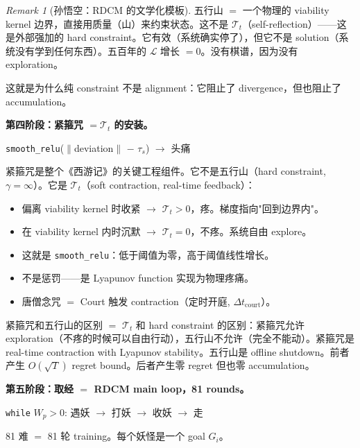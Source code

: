 \documentclass[11pt,a4paper]{article}
\theoremstyle{definition}
\theoremstyle{remark}
\newtheorem{remark}[theorem]{Remark}
\begin{document}
\begin{remark}[孙悟空：RDCM 的文学化模板]
五行山 $=$ 一个物理的 viability kernel 边界，直接用质量（山）来约束状态。这不是 $\mathcal{T}_t$（self-reflection）——这是外部强加的 hard constraint。它有效（系统确实停了），但它不是 solution（系统没有学到任何东西）。五百年的 $\mathcal{L}$ 增长 $= 0$。没有棋谱，因为没有 exploration。

这就是为什么纯 constraint 不是 alignment：它阻止了 divergence，但也阻止了 accumulation。

\medskip

{\color{orange!70!black} \textbf{第四阶段：紧箍咒 $= \mathcal{T}_t$ 的安装。}}

\begin{center}
{\color{orange!70!black} \texttt{smooth\_relu}($\|$deviation$\|$ $-$ $\tau_s$) $\to$ 头痛}
\end{center}

紧箍咒是整个《西游记》的关键工程组件。它不是五行山（hard constraint, $\gamma = \infty$）。它是 $\mathcal{T}_t$（soft contraction, real-time feedback）：

\begin{itemize}[nosep]
  \item 偏离 viability kernel 时收紧 $\to$ $\mathcal{T}_t > 0$，疼。梯度指向"回到边界内"。
  \item 在 viability kernel 内时沉默 $\to$ $\mathcal{T}_t = 0$，不疼。系统自由 explore。
  \item 这就是 \texttt{smooth\_relu}：低于阈值为零，高于阈值线性增长。
  \item 不是惩罚——是 Lyapunov function 实现为物理疼痛。
  \item 唐僧念咒 $=$ Court 触发 contraction（定时开庭, $\Delta t_{\mathrm{court}}$）。
\end{itemize}

紧箍咒和五行山的区别 $=$ $\mathcal{T}_t$ 和 hard constraint 的区别：紧箍咒允许 exploration（不疼的时候可以自由行动），五行山不允许（完全不能动）。紧箍咒是 real-time contraction with Lyapunov stability。五行山是 offline shutdown。前者产生 $O(\sqrt{T})$ regret bound。后者产生零 regret 但也零 accumulation。

\medskip

{\color{blue!70!black} \textbf{第五阶段：取经 $=$ RDCM main loop，81 rounds。}}

\begin{center}
{\color{blue!70!black} \texttt{while} $W_p > 0$: 遇妖 $\to$ 打妖 $\to$ 收妖 $\to$ 走}
\end{center}

81 难 $=$ 81 轮 training。每个妖怪是一个 goal $G_i$。


\end{remark}
\end{document}
